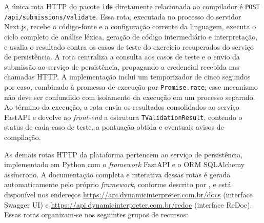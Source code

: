 A única rota HTTP do pacote \texttt{ide} diretamente relacionada ao compilador é \texttt{POST /api/}\allowbreak\texttt{submissions/}\allowbreak\texttt{validate}. Essa rota, executada no processo do servidor Next.js, recebe o código-fonte e a configuração corrente da linguagem, executa o ciclo completo de análise léxica, geração de código intermediário e interpretação, e avalia o resultado contra os casos de teste do exercício recuperados do serviço de persistência. A rota centraliza a consulta aos casos de teste e o envio da submissão ao serviço de persistência, propagando a credencial recebida nas chamadas HTTP. A implementação inclui um temporizador de cinco segundos por caso, combinado à promessa de execução por \texttt{Promise.race}; esse mecanismo não deve ser confundido com isolamento da execução em um processo separado. Ao término da execução, a rota envia os resultados consolidados ao serviço FastAPI e devolve ao \textit{front-end} a estrutura \texttt{TValidationResult}, contendo o status de cada caso de teste, a pontuação obtida e eventuais avisos de compilação.

As demais rotas HTTP da plataforma pertencem ao serviço de persistência, implementado em Python com o \textit{framework} FastAPI e o ORM SQLAlchemy assíncrono. A documentação completa e interativa dessas rotas é gerada automaticamente pelo próprio \textit{framework}, conforme descrito por , e está disponível nos endereços \url{https://api.dynamicinterpreter.com.br/docs} (interface Swagger UI) e \url{https://api.dynamicinterpreter.com.br/redoc} (interface ReDoc). Essas rotas organizam-se nos seguintes grupos de recursos:

